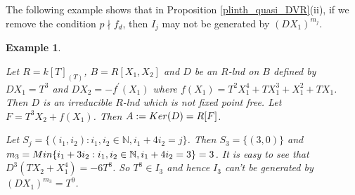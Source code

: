 \documentclass[a4paper,12pt]{article}
\newtheorem{cor}[thm]{Corollary}
\newtheorem{ex}[thm]{Example}
\newcommand{\bN}{\mathbb N}
\begin{document}
{	%
	
	
	
	
	
	
	
 \noindent The following example shows that in Proposition \ref{plinth_quasi_DVR}(ii), if we remove the condition $p\nmid f_d$, then $I_j$ may not be generated by $(DX_1)^{m_j}$.
	
	\begin{ex}\label{ex}
{\em
	Let $R=k[T]_{(T)}$, $B=R[X_1,X_2]$ and $D$ be an $R$-lnd on $B$ defined by $DX_1=T^3$ and $DX_2=-f^{\prime}(X_1)$ where $f(X_1)=T^{2}X_1^4+TX_1^{3}+X_1^2+TX_1$. Then $D$ is an irreducible $R$-lnd which is not fixed point free. Let $F=T^3X_2+f(X_1)$. Then $A:={\rm Ker}(D)=R[F]$. 
	
	\smallskip\noindent 
Let $S_j=\{(i_1,i_2):i_1,i_2\in\bN, i_1+4i_2=j\}$.	Then $S_3=\{(3,0)\}$ and $m_3={\rm Min}\{i_1+3i_2:i_1,i_2\in\bN,i_1+4i_2=3\}=3$. It is easy to see that $D^{3}(TX_2+X_1^4)=-6T^8$. So $T^8\in I_{3}$ and hence $I_3$ can't be generated by $(DX_1)^{m_3}=T^9$.
	
}
\end{ex}}
\end{document}
